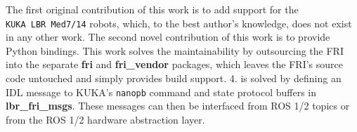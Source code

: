 The first original contribution of this work is to add support for the
\texttt{KUKA\ LBR\ Med7/14} robots, which, to the best author's
knowledge, does not exist in any other work. The second novel
contribution of this work is to provide Python bindings. This work
solves the maintainability by outsourcing the FRI into the separate
\textbf{fri} and \textbf{fri\_vendor} packages, which leaves the FRI's
source code untouched and simply provides build support. 4. is solved by
defining an IDL message to KUKA's \texttt{nanopb} command and state
protocol buffers in \textbf{lbr\_fri\_msgs}. These messages can then be
interfaced from ROS 1/2 topics or from the ROS 1/2 hardware abstraction
layer.

\begin{landscape}
\begin{table}
\centering
\caption{Overview of existing frameworks for interfacing the KUKA LBRs.
A bullet point indicates support for the respective feature.}
\centering
{}
\end{table}
\end{landscape}
